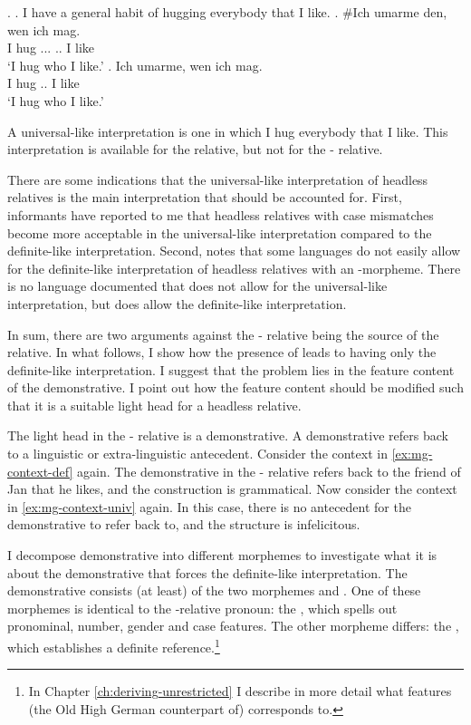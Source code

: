 \ex.
\a. I have a general habit of hugging everybody that I like.\label{ex:mg-context-univ}
\bg. \#Ich umarme den, wen ich mag.\\
I hug ... .. I like\\
`I hug who I like.'
\bg. Ich umarme, wen ich mag.\\
I hug .. I like\\
`I hug who I like.'

A universal-like interpretation is one in which I hug everybody that I like.
This interpretation is available for the  relative, but not for the - relative.

There are some indications that the universal-like interpretation of headless relatives is the main interpretation that should be accounted for.
First, informants have reported to me that headless relatives with case mismatches become more acceptable in the universal-like interpretation compared to the definite-like interpretation.
Second,  notes that some languages do not easily allow for the definite-like interpretation of headless relatives with an -morpheme. There is no language documented that does not allow for the universal-like interpretation, but does allow the definite-like interpretation.

In sum, there are two arguments against the - relative being the source of the  relative. In what follows, I show how the presence of  leads to having only the definite-like interpretation. I suggest that the problem lies in the feature content of the demonstrative. I point out how the feature content should be modified such that it is a suitable light head for a headless relative.

The light head in the - relative is a demonstrative. A demonstrative refers back to a linguistic or extra-linguistic antecedent. Consider the context in \ref{ex:mg-context-def} again. The demonstrative  in the - relative refers back to the friend of Jan that he likes, and the construction is grammatical. Now consider the context in \ref{ex:mg-context-univ} again. In this case, there is no antecedent for the demonstrative  to refer back to, and the structure is infelicitous.

I decompose demonstrative  into different morphemes to investigate what it is about the demonstrative that forces the definite-like interpretation. The demonstrative consists (at least) of the two morphemes  and . One of these morphemes is identical to the -relative pronoun: the , which spells out pronominal, number, gender and case features. The other morpheme differs: the , which establishes a definite reference.\footnote{
In Chapter \ref{ch:deriving-unrestricted} I describe in more detail what features (the Old High German counterpart of)  corresponds to.
}

